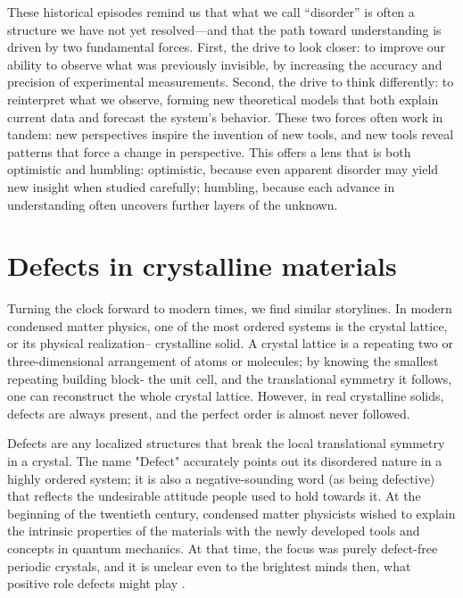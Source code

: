 These historical episodes remind us that what we call “disorder” is often a structure we have not yet resolved—and that the path toward understanding is driven by two fundamental forces. First, the drive to look closer: to improve our ability to observe what was previously invisible, by increasing the accuracy and precision of experimental measurements. Second, the drive to think differently: to reinterpret what we observe, forming new theoretical models that both explain current data and forecast the system’s behavior. These two forces often work in tandem: new perspectives inspire the invention of new tools, and new tools reveal patterns that force a change in perspective. This offers a lens that is both optimistic and humbling: optimistic, because even apparent disorder may yield new insight when studied carefully; humbling, because each advance in understanding often uncovers further layers of the unknown.

\section{Defects in crystalline materials}
Turning the clock forward to modern times, we find similar storylines. In modern condensed matter physics, one of the most ordered systems is the crystal lattice, or its physical realization-- crystalline solid. A crystal lattice is a repeating two or three-dimensional arrangement of atoms or molecules; by knowing the smallest repeating building block- the unit cell, and the translational symmetry it follows, one can reconstruct the whole crystal lattice. However, in real crystalline solids, defects are always present, and the perfect order is almost never followed. 

Defects are any localized structures that break the local translational symmetry in a crystal. The name "Defect" accurately points out its disordered nature in a highly ordered system; it is also a negative-sounding word (as being defective) that reflects the undesirable attitude people used to hold towards it. At the beginning of the twentieth century, condensed matter physicists wished to explain the intrinsic properties of the materials with the newly developed tools and concepts in quantum mechanics. At that time, the focus was purely defect-free periodic crystals, and it is unclear even to the brightest minds then, what positive role defects might play \cite{lorentzVortrageUberKinetische1914, spitalerPerspectivesTheoryDefects2018}. 

\vspace{1cm}


